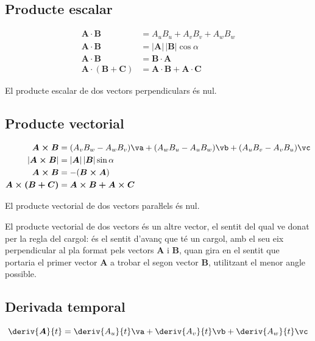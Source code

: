 \documentclass[catalan,a4paper,twoside,11pt]{article}
\begin{document}
\subsection{Producte escalar}
\vspace{-5mm}
\begin{align}
    \boldsymbol{A\cdot B} &= A_u B_u + A_v B_v + A_w B_w\\
    \boldsymbol{A\cdot B} &=|\boldsymbol{A}| \, |\boldsymbol{B}| \cos\alpha\\
    \boldsymbol{A\cdot B} &=\boldsymbol{B\cdot A}\\
    \boldsymbol{A\cdot(B+C)} &= \boldsymbol{A\cdot B+ A\cdot C}
\end{align}

El producte escalar de dos vectors perpendiculars  és nul.

\subsection{Producte vectorial}
\vspace{-5mm}
\begin{align}
    \boldsymbol{A\times B} &= (A_v B_w - A_w B_v)\va + (A_w B_u - A_u B_w)\vb +
    (A_u B_v - A_v B_u)\vc \\
    |\boldsymbol{A\times B}| &=|\boldsymbol{A}| \, |\boldsymbol{B}| \sin\alpha\\
    \boldsymbol{A\times B} &=-(\boldsymbol{B\times A})\\
    \boldsymbol{A\times(B+C)} &= \boldsymbol{A\times B+ A\times C}
\end{align}

El producte vectorial de dos vectors paraŀlels  és nul.

El producte vectorial de dos vectors és un altre vector, el
sentit del qual ve donat per la regla del cargol: és el sentit
d'avanç que té un cargol, amb el seu eix perpendicular al
pla format pels vectors  $\boldsymbol{A}$ i $\boldsymbol{B}$, quan
gira en el sentit que portaria el primer vector  $\boldsymbol{A}$ a
trobar el segon vector $\boldsymbol{B}$, utilitzant el menor angle
possible.

\subsection{Derivada temporal}
\begin{equation}
    \deriv{\boldsymbol{A}}{t} = \deriv{A_u}{t}\va +
    \deriv{A_v}{t}\vb + \deriv{A_w}{t}\vc
\end{equation}
\end{document}
